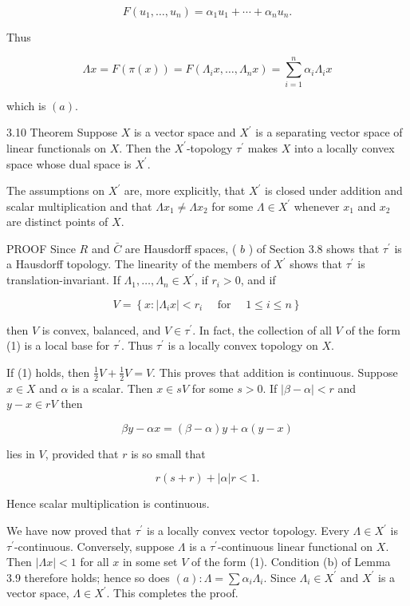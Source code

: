 \documentclass[10pt]{article}
\begin{document}
$$
F\left(u_{1}, \ldots, u_{n}\right)=\alpha_{1} u_{1}+\cdots+\alpha_{n} u_{n} .
$$

Thus

$$
\Lambda x=F(\pi(x))=F\left(\Lambda_{i} x, \ldots, \Lambda_{n} x\right)=\sum_{i=1}^{n} \alpha_{i} \Lambda_{i} x
$$

which is $(a)$.

3.10 Theorem Suppose $X$ is a vector space and $X^{\prime}$ is a separating vector space of linear functionals on $X$. Then the $X^{\prime}$-topology $\tau^{\prime}$ makes $X$ into a locally convex space whose dual space is $X^{\prime}$.

The assumptions on $X^{\prime}$ are, more explicitly, that $X^{\prime}$ is closed under addition and scalar multiplication and that $\Lambda x_{1} \neq \Lambda x_{2}$ for some $\Lambda \in X^{\prime}$ whenever $x_{1}$ and $x_{2}$ are distinct points of $X$.

PROOF Since $R$ and $\bar{C}$ are Hausdorff spaces, ( $b$ ) of Section 3.8 shows that $\tau^{\prime}$ is a Hausdorff topology. The linearity of the members of $X^{\prime}$ shows that $\tau^{\prime}$ is translation-invariant. If $\Lambda_{1}, \ldots, \Lambda_{n} \in X^{\prime}$, if $r_{i}>0$, and if

$$
V=\left\{x:\left|\Lambda_{i} x\right|<r_{i} \quad \text { for } \quad 1 \leq i \leq n\right\}
$$

then $V$ is convex, balanced, and $V \in \tau^{\prime}$. In fact, the collection of all $V$ of the form (1) is a local base for $\tau^{\prime}$. Thus $\tau^{\prime}$ is a locally convex topology on $X$.

If (1) holds, then $\frac{1}{2} V+\frac{1}{2} V=V$. This proves that addition is continuous. Suppose $x \in X$ and $\alpha$ is a scalar. Then $x \in s V$ for some $s>0$. If $|\beta-\alpha|<r$ and $y-x \in r V$ then

$$
\beta y-\alpha x=(\beta-\alpha) y+\alpha(y-x)
$$

lies in $V$, provided that $r$ is so small that

$$
r(s+r)+|\alpha| r<1 .
$$

Hence scalar multiplication is continuous.

We have now proved that $\tau^{\prime}$ is a locally convex vector topology. Every $\Lambda \in X^{\prime}$ is $\tau^{\prime}$-continuous. Conversely, suppose $\Lambda$ is a $\tau^{\prime}$-continuous linear functional on $X$. Then $|\Lambda x|<1$ for all $x$ in some set $V$ of the form (1). Condition (b) of Lemma 3.9 therefore holds; hence so does $(a): \Lambda=\sum \alpha_{i} \Lambda_{i}$. Since $\Lambda_{i} \in X^{\prime}$ and $X^{\prime}$ is a vector space, $\Lambda \in X^{\prime}$. This completes the proof.
\end{document}
